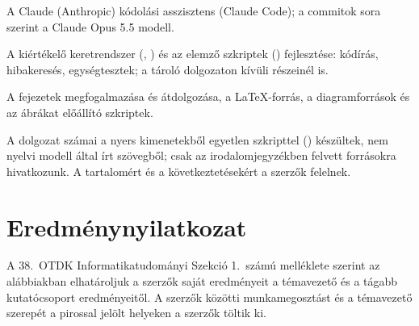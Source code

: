 \begin{sloppypar}
\begin{description}[style=nextline,leftmargin=0.6cm]
\item[Eszköz] A Claude (Anthropic) kódolási asszisztens (Claude Code); a commitok  sora
szerint a Claude Opus 5.5 modell. 
\item[Szoftverfejlesztés] A kiértékelő keretrendszer (, ) és az elemző
szkriptek () fejlesztése: kódírás, hibakeresés, egységtesztek; a tároló dolgozaton kívüli
részeinél is. 
\item[A dolgozat szövege] A fejezetek megfogalmazása és átdolgozása, a LaTeX-forrás, a diagramforrások és az
ábrákat előállító szkriptek. 
\item[Mérték] 
\item[Más eszközök] 
\item[Ellenőrzés] A dolgozat számai a nyers kimenetekből egyetlen szkripttel ()
készültek, nem nyelvi modell által írt szövegből; csak az irodalomjegyzékben felvett forrásokra hivatkozunk.
 A
tartalomért és a következtetésekért a szerzők felelnek. 
\end{description}
\end{sloppypar}

\chapter{Eredménynyilatkozat}
\label{app-eredmeny}

A 38.~OTDK Informatikatudományi Szekció 1.~számú melléklete szerint az alábbiakban elhatároljuk a szerzők
saját eredményeit a témavezető és a tágabb kutatócsoport eredményeitől. A szerzők közötti munkamegosztást és a
témavezető szerepét a pirossal jelölt helyeken a szerzők töltik ki.

